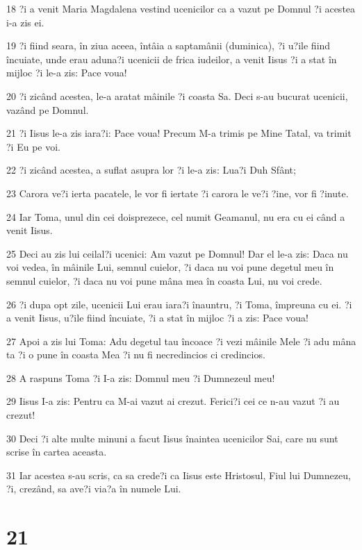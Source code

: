\par 18 ?i a venit Maria Magdalena vestind ucenicilor ca a vazut pe Domnul ?i acestea i-a zis ei.
\par 19 ?i fiind seara, în ziua aceea, întâia a saptamânii (duminica), ?i u?ile fiind încuiate, unde erau aduna?i ucenicii de frica iudeilor, a venit Iisus ?i a stat în mijloc ?i le-a zis: Pace voua!
\par 20 ?i zicând acestea, le-a aratat mâinile ?i coasta Sa. Deci s-au bucurat ucenicii, vazând pe Domnul.
\par 21 ?i Iisus le-a zis iara?i: Pace voua! Precum M-a trimis pe Mine Tatal, va trimit ?i Eu pe voi.
\par 22 ?i zicând acestea, a suflat asupra lor ?i le-a zis: Lua?i Duh Sfânt;
\par 23 Carora ve?i ierta pacatele, le vor fi iertate ?i carora le ve?i ?ine, vor fi ?inute.
\par 24 Iar Toma, unul din cei doisprezece, cel numit Geamanul, nu era cu ei când a venit Iisus.
\par 25 Deci au zis lui ceilal?i ucenici: Am vazut pe Domnul! Dar el le-a zis: Daca nu voi vedea, în mâinile Lui, semnul cuielor, ?i daca nu voi pune degetul meu în semnul cuielor, ?i daca nu voi pune mâna mea în coasta Lui, nu voi crede.
\par 26 ?i dupa opt zile, ucenicii Lui erau iara?i înauntru, ?i Toma, împreuna cu ei. ?i a venit Iisus, u?ile fiind încuiate, ?i a stat în mijloc ?i a zis: Pace voua!
\par 27 Apoi a zis lui Toma: Adu degetul tau încoace ?i vezi mâinile Mele ?i adu mâna ta ?i o pune în coasta Mea ?i nu fi necredincios ci credincios.
\par 28 A raspuns Toma ?i I-a zis: Domnul meu ?i Dumnezeul meu!
\par 29 Iisus I-a zis: Pentru ca M-ai vazut ai crezut. Ferici?i cei ce n-au vazut ?i au crezut!
\par 30 Deci ?i alte multe minuni a facut Iisus înaintea ucenicilor Sai, care nu sunt scrise în cartea aceasta.
\par 31 Iar acestea s-au scris, ca sa crede?i ca Iisus este Hristosul, Fiul lui Dumnezeu, ?i, crezând, sa ave?i via?a în numele Lui.

\chapter{21}

